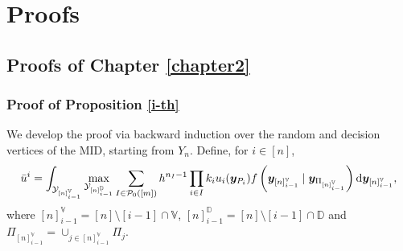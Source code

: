 
\chapter{Proofs} %

\label{appendixA} %


\section{Proofs of Chapter \ref{chapter2}}
\subsection{Proof of Proposition \ref{i-th}}
\label{appendixA1}
We develop the proof via backward induction over the random and decision vertices of the MID, starting from $Y_n$. Define, for $i\in[n]$,
\begin{equation*}
\bar{u}^i=\int_{\mathcal{Y}_{[n]_{i-1}^{\mathbb{V}}}}\max_{\mathcal{Y}_{[n]_{i-1}^{\mathbb{D}}}}\sum_{I\in\mathcal{P}_0([m])}h^{n_I-1}\prod_{i\in I}k_iu_i(\bm{y}_{P_i})f\left(\bm{y}_{[n]_{i-1}^{\mathbb{V}}}\;|\;\bm{y}_{\Pi_{[n]_{i-1}^{\mathbb{V}}}}\right)\textnormal{d}\bm{y}_{[n]_{i-1}^{\mathbb{V}}},
\end{equation*}
where $[n]_{i-1}^{\mathbb{V}}=[n]\setminus[i-1]\cap \mathbb{V}$, $[n]_{i-1}^{\mathbb{D}}=[n]\setminus[i-1]\cap \mathbb{D}$ and $\Pi_{[n]_{i-1}^{\mathbb{V}}}=\cup_{j\in[n]_{i-1}^{\mathbb{V}}}\Pi_j$.

